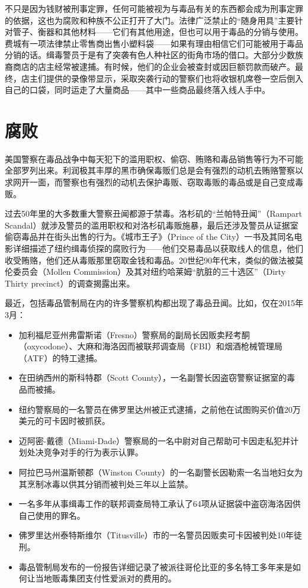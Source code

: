 \documentclass[fontset=fandol, a4paper, 12pt, openright]{ctexbook}
\begin{document}
不只是因为钱财被刑事定罪，任何可能被视为与毒品有关的东西都会成为刑事定罪的依据，这也为腐败和种族不公正打开了大门。法律广泛禁止的“随身用具”主要针对管子、衡器和其他材料——它们有其他用途，但也可以用于毒品的分销与使用。费城有一项法律禁止零售商出售小塑料袋——如果有理由相信它们可能被用于毒品分销的话。缉毒警员于是有了突袭有色人种社区的街角市场的借口。大部分少数族裔商店的店主经常被逮捕。有时候，他们的企业会被查封或因巨额罚款而破产。最终，店主们提供的录像带显示，采取突袭行动的警察们也将收银机席卷一空后倒入自己的口袋，同时运走了大量商品——其中一些商品最终落入线人手中。

\section{腐败}

美国警察在毒品战争中每天犯下的滥用职权、偷窃、贿赂和毒品销售等行为不可能全部罗列出来。利润极其丰厚的黑市确保毒贩们总是会有强烈的动机去贿赂警察以求网开一面，而警察也有强烈的动机去保护毒贩、窃取毒贩的毒品或是自己变成毒贩。

过去50年里的大多数重大警察丑闻都源于禁毒。洛杉矶的“兰帕特丑闻”（Rampart Scandal）就涉及警员的滥用职权和对洛杉矶毒贩施暴，最后还涉及警员从证据室偷窃毒品并在街头出售的行为。《城市王子》（Prince of the City）一书及其同名电影详细描述了纽约缉毒侦探的腐败行为——他们交易毒品以获取线人的信息，他们收受贿赂，他们还从毒贩那里窃取金钱和毒品。20世纪90年代末，类似的做法被莫伦委员会（Mollen Commission）及其对纽约哈莱姆“肮脏的三十选区”（Dirty Thirty precinct）的调查揭露出来。

最近，包括毒品管制局在内的许多警察机构都出现了毒品丑闻。比如，仅在2015年3月：

\begin{itemize}
    \item 加利福尼亚州弗雷斯诺（Fresno）警察局的副局长因贩卖羟考酮（oxycodone）、大麻和海洛因而被联邦调查局（FBI）和烟酒枪械管理局（ATF）的特工逮捕。
    \item 在田纳西州的斯科特郡（Scott County），一名副警长因盗窃警察证据室的毒品而被捕。
    \item 纽约警察局的一名警员在佛罗里达州被正式逮捕，之前他在试图购买价值20万美元的可卡因时被抓获。
    \item 迈阿密-戴德（Miami-Dade）警察局的一名中尉对自己帮助可卡因走私犯并计划处决竞争对手的行为表示认罪。
    \item 阿拉巴马州温斯顿郡（Winston County）的一名副警长因勒索一名当地妇女为其烹制冰毒以供其分销而被判处三年以上监禁。
    \item 一名多年从事缉毒工作的联邦调查局特工承认了64项从证据袋中盗窃海洛因供自己使用的罪名。
    \item 佛罗里达州泰特斯维尔（Titusville）市的一名警员因贩卖可卡因被判处10年徒刑。
    \item 毒品管制局发布的一份报告详细记录了被派往哥伦比亚的多名特工多年来是如何让当地贩毒集团支付性爱派对的费用的。
\end{itemize}
\end{document}
